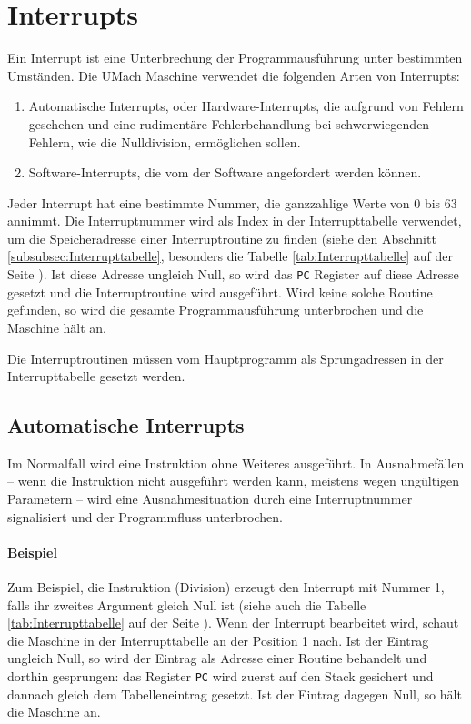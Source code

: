 \section{Interrupts}
\label{sec:Interrupts}

Ein Interrupt ist eine Unterbrechung der Programmausführung unter bestimmten
Umständen. Die UMach Maschine verwendet die folgenden Arten von Interrupts:

\begin{enumerate}
 \item Automatische Interrupts, oder Hardware-Interrupts, die aufgrund von
       Fehlern geschehen und eine rudimentäre Fehlerbehandlung bei
       schwerwiegenden Fehlern, wie die Nulldivision, ermöglichen sollen.
 \item Software-Interrupts, die vom der Software angefordert
       werden können.
\end{enumerate}

Jeder Interrupt hat eine bestimmte Nummer, die ganzzahlige Werte von 0 bis 63
annimmt. Die Interruptnummer wird als Index in der Interrupttabelle
verwendet, um die Speicheradresse einer Interruptroutine zu finden (siehe den
Abschnitt \ref{subsubsec:Interrupttabelle}, besonders die Tabelle
\ref{tab:Interrupttabelle} auf der Seite \pageref{tab:Interrupttabelle}). Ist
diese Adresse ungleich Null, so wird das \texttt{PC} Register auf diese Adresse
gesetzt und die Interruptroutine wird ausgeführt. Wird keine solche Routine
gefunden, so wird die gesamte Programmausführung unterbrochen und die Maschine
hält an.

Die Interruptroutinen müssen vom Hauptprogramm als Sprungadressen in der
Interrupttabelle gesetzt werden.


\subsection{Automatische Interrupts}

Im Normalfall wird eine Instruktion ohne Weiteres ausgeführt. In Ausnahmefällen
-- wenn die Instruktion nicht ausgeführt werden kann, meistens wegen ungültigen
Parametern -- wird eine Ausnahmesituation durch eine
Interruptnummer signalisiert und der Programmfluss unterbrochen.




\paragraph{Beispiel}
Zum Beispiel, die  Instruktion (Division) erzeugt den Interrupt mit
Nummer 1, falls ihr zweites Argument gleich Null ist (siehe auch die Tabelle
\ref{tab:Interrupttabelle} auf der Seite \pageref{tab:Interrupttabelle}). Wenn
der Interrupt bearbeitet wird, schaut die Maschine in der Interrupttabelle an
der Position 1 nach. Ist der Eintrag ungleich Null, so wird der Eintrag als
Adresse einer Routine behandelt und dorthin gesprungen: das Register \texttt{PC}
wird zuerst auf den Stack gesichert und dannach gleich dem Tabelleneintrag
gesetzt. Ist der Eintrag dagegen Null, so hält die Maschine an.



